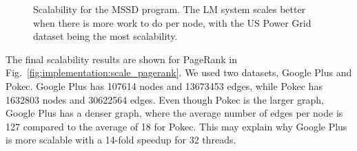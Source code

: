 \begin{figure}[]
        \caption{Scalability for the MSSD program. The LM system scales better
        when there is more work to do per node, with the US Power Grid dataset being the
        most scalability.}

        \label{fig:implementation:scale_sssp}
\end{figure}

The final scalability results are shown for PageRank in
Fig.~\ref{fig:implementation:scale_pagerank}. We used two datasets, Google Plus
and Pokec. Google Plus has 107614 nodes and 13673453 edges, while Pokec has
1632803 nodes and 30622564 edges. Even though Pokec is the larger graph, Google
Plus has a denser graph, where the average number of edges per node is 127
compared to the average of 18 for Pokec. This may explain why Google Plus is
more scalable with a 14-fold speedup for 32 threads.

